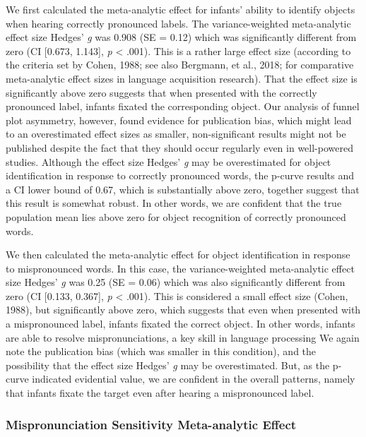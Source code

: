 \documentclass[man]{apa6}
\theoremstyle{definition}
\theoremstyle{definition}
\theoremstyle{definition}
\theoremstyle{remark}
\begin{document}
We first calculated the meta-analytic effect for infants' ability to
identify objects when hearing correctly pronounced labels. The
variance-weighted meta-analytic effect size Hedges' \emph{g} was 0.908
(SE = 0.12) which was significantly different from zero (CI {[}0.673,
1.143{]}, \emph{p} \textless{} .001). This is a rather large effect size
(according to the criteria set by Cohen, 1988; see also Bergmann, et
al., 2018; for comparative meta-analytic effect sizes in language
acquisition research). That the effect size is significantly above zero
suggests that when presented with the correctly pronounced label,
infants fixated the corresponding object. Our analysis of funnel plot
asymmetry, however, found evidence for publication bias, which might
lead to an overestimated effect sizes as smaller, non-significant
results might not be published despite the fact that they should occur
regularly even in well-powered studies. Although the effect size Hedges'
\emph{g} may be overestimated for object identification in response to
correctly pronounced words, the p-curve results and a CI lower bound of
0.67, which is substantially above zero, together suggest that this
result is somewhat robust. In other words, we are confident that the
true population mean lies above zero for object recognition of correctly
pronounced words.

We then calculated the meta-analytic effect for object identification in
response to mispronounced words. In this case, the variance-weighted
meta-analytic effect size Hedges' \emph{g} was 0.25 (SE = 0.06) which
was also significantly different from zero (CI {[}0.133, 0.367{]},
\emph{p} \textless{} .001). This is considered a small effect size
(Cohen, 1988), but significantly above zero, which suggests that even
when presented with a mispronounced label, infants fixated the correct
object. In other words, infants are able to resolve mispronunciations, a
key skill in language processing We again note the publication bias
(which was smaller in this condition), and the possibility that the
effect size Hedges' \emph{g} may be overestimated. But, as the p-curve
indicated evidential value, we are confident in the overall patterns,
namely that infants fixate the target even after hearing a mispronounced
label.

\subsubsection{Mispronunciation Sensitivity Meta-analytic
Effect}\label{mispronunciation-sensitivity-meta-analytic-effect}
\end{document}
